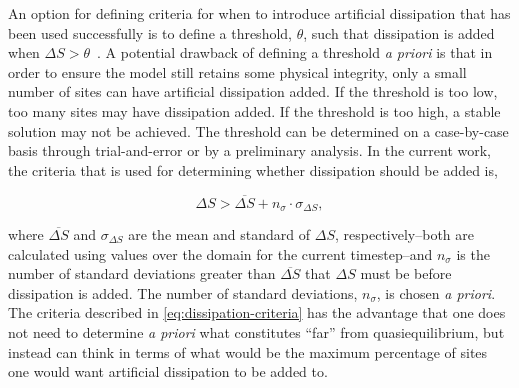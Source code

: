 \documentclass{article}
\begin{document}
An option for defining criteria for when to introduce artificial dissipation that has been used successfully is to define a threshold, $\theta$, such that dissipation is added when $\Delta S > \theta$~\cite{gorban2014enhancement,brownlee2006stabilization,brownlee2007stability,brownlee2008nonequilibrium}.
A potential drawback of defining a threshold \textit{a priori} is that in order to ensure the model still retains some physical integrity, only a small number of sites can have artificial dissipation added.
If the threshold is too low, too many sites may have dissipation added.
If the threshold is too high, a stable solution may not be achieved.
The threshold can be determined on a case-by-case basis through trial-and-error or by a preliminary analysis.
In the current work, the criteria that is used for determining whether dissipation should be added is,

\begin{equation} \label{eq:dissipation-criteria}
    \Delta S > \overline{\Delta S} + n_\sigma \cdot \sigma_{\Delta S},
\end{equation}

\noindent where $\overline{\Delta S}$ and $\sigma_{\Delta S}$ are the mean and standard of $\Delta S$, respectively--both are calculated using values over the domain for the current timestep--and $n_\sigma$ is the number of standard deviations greater than $\overline{\Delta S}$ that $\Delta S$ must be before dissipation is added.
The number of standard deviations, $n_\sigma$, is chosen \textit{a priori}.
The criteria described in \ref{eq:dissipation-criteria} has the advantage that one does not need to determine \textit{a priori} what constitutes ``far'' from quasiequilibrium, but instead can think in terms of what would be the maximum percentage of sites one would want artificial dissipation to be added to.
\end{document}
